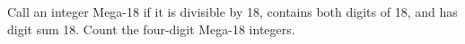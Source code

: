 Call an integer Mega-18 if it is divisible by 18, contains both digits of 18, and has digit sum 18. Count the four-digit Mega-18 integers.
